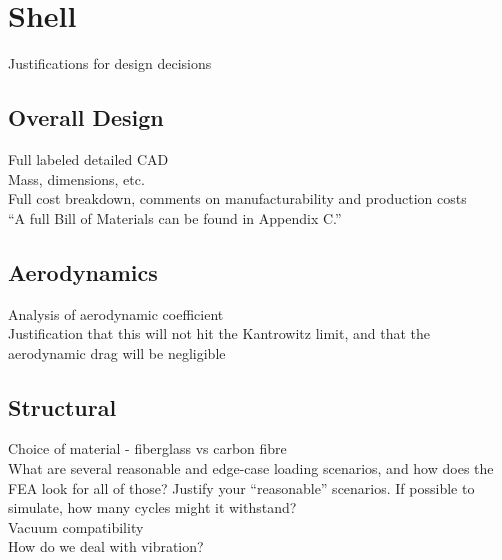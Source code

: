 \documentclass[main.tex]{subfile}
\begin{document}
    \section{Shell}
    Justifications for design decisions
    \subsection{Overall Design}
    Full labeled detailed CAD\\
    Mass, dimensions, etc.\\
    Full cost breakdown, comments on manufacturability and production costs\\
    “A full Bill of Materials can be found in Appendix C.”

    \subsection{Aerodynamics}
    Analysis of aerodynamic coefficient\\
    Justification that this will not hit the Kantrowitz limit, and that the aerodynamic drag will be negligible

    \subsection{Structural}
    Choice of material - fiberglass vs carbon fibre\\
    What are several reasonable and edge-case loading scenarios, and how does the FEA look for all of those? Justify your “reasonable” scenarios. If possible to simulate, how many cycles might it withstand?\\
    Vacuum compatibility\\
    How do we deal with vibration?
\end{document}
